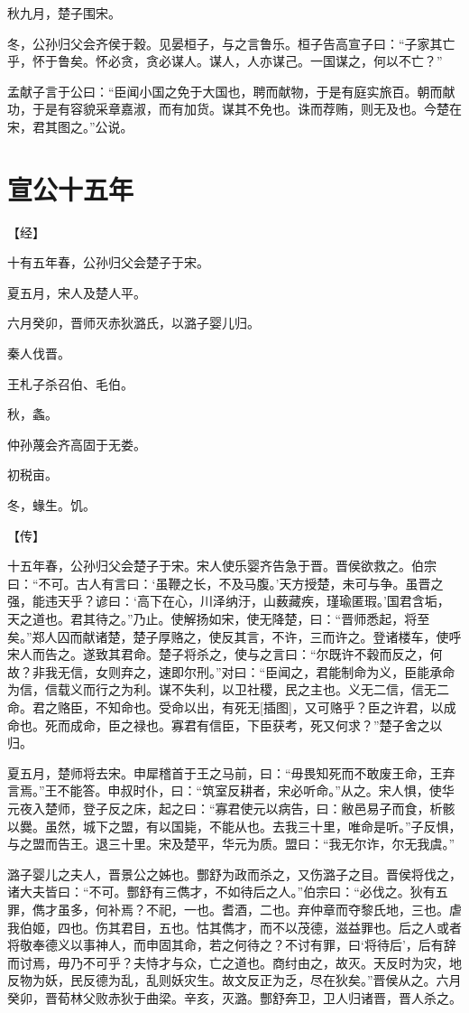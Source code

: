\documentclass[a4paper,12pt,UTF8,twoside]{ctexbook}
\begin{document}
秋九月，楚子围宋。

冬，公孙归父会齐侯于穀。见晏桓子，与之言鲁乐。桓子告高宣子曰：“子家其亡乎，怀于鲁矣。怀必贪，贪必谋人。谋人，人亦谋己。一国谋之，何以不亡？”

孟献子言于公曰：“臣闻小国之免于大国也，聘而献物，于是有庭实旅百。朝而献功，于是有容貌采章嘉淑，而有加货。谋其不免也。诛而荐贿，则无及也。今楚在宋，君其图之。”公说。

\chapter{宣公十五年}



【经】

十有五年春，公孙归父会楚子于宋。

夏五月，宋人及楚人平。

六月癸卯，晋师灭赤狄潞氏，以潞子婴儿归。

秦人伐晋。

王札子杀召伯、毛伯。

秋，螽。

仲孙蔑会齐高固于无娄。

初税亩。

冬，蝝生。饥。

【传】

十五年春，公孙归父会楚子于宋。宋人使乐婴齐告急于晋。晋侯欲救之。伯宗曰：“不可。古人有言曰：‘虽鞭之长，不及马腹。’天方授楚，未可与争。虽晋之强，能违天乎？谚曰：‘高下在心，川泽纳汙，山薮藏疾，瑾瑜匿瑕。’国君含垢，天之道也。君其待之。”乃止。使解扬如宋，使无降楚，曰：“晋师悉起，将至矣。”郑人囚而献诸楚，楚子厚赂之，使反其言，不许，三而许之。登诸楼车，使呼宋人而告之。遂致其君命。楚子将杀之，使与之言曰：“尔既许不穀而反之，何故？非我无信，女则弃之，速即尔刑。”对曰：“臣闻之，君能制命为义，臣能承命为信，信载义而行之为利。谋不失利，以卫社稷，民之主也。义无二信，信无二命。君之赂臣，不知命也。受命以出，有死无[插图]，又可赂乎？臣之许君，以成命也。死而成命，臣之禄也。寡君有信臣，下臣获考，死又何求？”楚子舍之以归。

夏五月，楚师将去宋。申犀稽首于王之马前，曰：“毋畏知死而不敢废王命，王弃言焉。”王不能答。申叔时仆，曰：“筑室反耕者，宋必听命。”从之。宋人惧，使华元夜入楚师，登子反之床，起之曰：“寡君使元以病告，曰：敝邑易子而食，析骸以爨。虽然，城下之盟，有以国毙，不能从也。去我三十里，唯命是听。”子反惧，与之盟而告王。退三十里。宋及楚平，华元为质。盟曰：“我无尔诈，尔无我虞。”

潞子婴儿之夫人，晋景公之姊也。酆舒为政而杀之，又伤潞子之目。晋侯将伐之，诸大夫皆曰：“不可。酆舒有三儁才，不如待后之人。”伯宗曰：“必伐之。狄有五罪，儁才虽多，何补焉？不祀，一也。耆酒，二也。弃仲章而夺黎氏地，三也。虐我伯姬，四也。伤其君目，五也。怙其儁才，而不以茂德，滋益罪也。后之人或者将敬奉德义以事神人，而申固其命，若之何待之？不讨有罪，曰‘将待后’，后有辞而讨焉，毋乃不可乎？夫恃才与众，亡之道也。商纣由之，故灭。天反时为灾，地反物为妖，民反德为乱，乱则妖灾生。故文反正为乏，尽在狄矣。”晋侯从之。六月癸卯，晋荀林父败赤狄于曲梁。辛亥，灭潞。酆舒奔卫，卫人归诸晋，晋人杀之。
\end{document}
